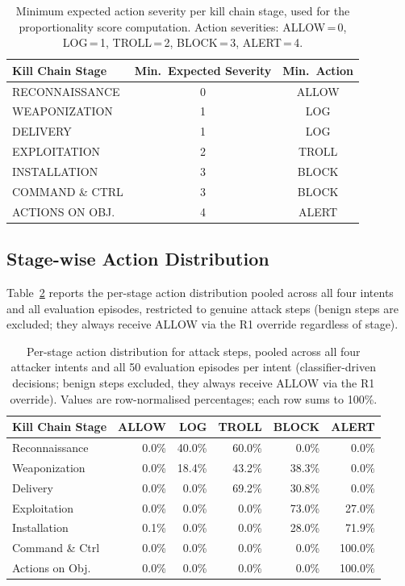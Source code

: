 \begin{table}[ht]
  \centering
  \caption{Minimum expected action severity per kill chain stage, used for
           the proportionality score computation.
           Action severities: ALLOW\,=\,0, LOG\,=\,1, TROLL\,=\,2,
           BLOCK\,=\,3, ALERT\,=\,4.}
  \label{tab:min_severity}
  \begin{tabular}{lcc}
    \toprule
    Kill Chain Stage & Min.\ Expected Severity & Min.\ Action \\
    \midrule
    RECONNAISSANCE   & 0 & ALLOW \\
    WEAPONIZATION    & 1 & LOG   \\
    DELIVERY         & 1 & LOG   \\
    EXPLOITATION     & 2 & TROLL \\
    INSTALLATION     & 3 & BLOCK \\
    COMMAND \& CTRL  & 3 & BLOCK \\
    ACTIONS ON OBJ.  & 4 & ALERT \\
    \bottomrule
  \end{tabular}
\end{table}

\subsection{Stage-wise Action Distribution}

Table~\ref{tab:stage_action_dist} reports the per-stage action distribution
pooled across all four intents and all evaluation episodes,
restricted to genuine attack steps (benign steps are excluded; they always
receive ALLOW via the R1 override regardless of stage).

\begin{table}[ht]
  \centering
  \caption{Per-stage action distribution for attack steps, pooled
           across all four attacker intents and all 50 evaluation episodes
           per intent (classifier-driven decisions; benign steps excluded,
           they always receive ALLOW via the R1 override).
           Values are row-normalised percentages; each row sums to 100\%.}
  \label{tab:stage_action_dist}
  \begin{tabular}{lrrrrr}
    \toprule
    Kill Chain Stage & ALLOW & LOG & TROLL & BLOCK & ALERT \\
    \midrule
    Reconnaissance   & 0.0\% & 40.0\% & 60.0\% &  0.0\% &  0.0\% \\
    Weaponization    & 0.0\% & 18.4\% & 43.2\% & 38.3\% &  0.0\% \\
    Delivery         & 0.0\% &  0.0\% & 69.2\% & 30.8\% &  0.0\% \\
    Exploitation     & 0.0\% &  0.0\% &  0.0\% & 73.0\% & 27.0\% \\
    Installation     & 0.1\% &  0.0\% &  0.0\% & 28.0\% & 71.9\% \\
    Command \& Ctrl  & 0.0\% &  0.0\% &  0.0\% &  0.0\% & 100.0\% \\
    Actions on Obj.  & 0.0\% &  0.0\% &  0.0\% &  0.0\% & 100.0\% \\
    \bottomrule
  \end{tabular}
\end{table}

